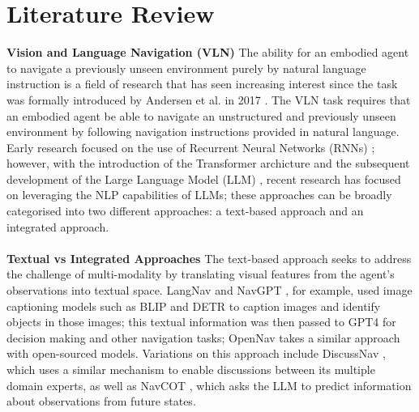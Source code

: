 \documentclass{svproc}
\begin{document}
\section{Literature Review}
    \textbf{Vision and Language Navigation (VLN)}  The ability for an embodied agent to navigate a previously unseen environment purely by natural language instruction is a field of research that has seen increasing interest since the task was formally introduced by Andersen et al. in 2017 \cite{8578485}. The VLN task requires that an embodied agent be able to navigate an unstructured and previously unseen environment by following navigation instructions provided in natural language. Early research focused on the use of Recurrent Neural Networks (RNNs) \cite{8578485, 8954045, 8953608, li2019robustnavigationlanguagepretraining}; however, with the introduction of the Transformer archicture \cite{attenion_is_all_you_need} and the subsequent development of the Large Language Model (LLM) \cite{radford2018improving, touvron2023llamaopenefficientfoundation}, recent research has focused on leveraging the NLP capabilities of LLMs; these approaches can be broadly categorised into two different approaches: a text-based approach and an integrated approach.
    \\ \\
    \textbf{Textual vs Integrated Approaches} The text-based approach seeks to address the challenge of multi-modality by translating visual features from the agent's observations into textual space. LangNav \cite{pan2024langnavlanguageperceptualrepresentation} and NavGPT \cite{zhou2023navgptexplicitreasoningvisionandlanguage}, for example, used image captioning models such as BLIP \cite{li2022blipbootstrappinglanguageimagepretraining, li2023blip2bootstrappinglanguageimagepretraining} and DETR \cite{zhu2021deformabledetrdeformabletransformers} to caption images and identify objects in those images; this textual information was then passed to GPT4 for decision making and other navigation tasks; OpenNav \cite{open-nav} takes a similar approach with open-sourced models. Variations on this approach include DiscussNav \cite{long2023_discussnav}, which uses a similar mechanism to enable discussions between its multiple domain experts, as well as NavCOT \cite{lin2024navcotboostingllmbasedvisionandlanguage}, which asks the LLM to predict information about observations from future states.
\end{document}

